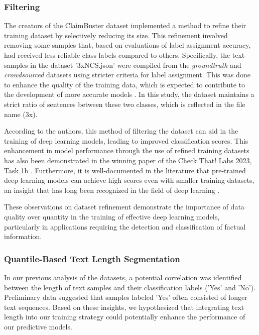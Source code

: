 \subsubsection{Filtering}

The creators of the ClaimBuster dataset implemented a method to refine their training dataset by selectively reducing its size. This refinement involved removing some samples that, based on evaluations of label assignment accuracy, had received less reliable class labels compared to others. Specifically, the text samples in the dataset '3xNCS.json' were compiled from the \textit{groundtruth} and \textit{crowdsourced} datasets using stricter criteria for label assignment. This was done to enhance the quality of the training data, which is expected to contribute to the development of more accurate models \cite{meng2020gradientbased}. In this study, the dataset maintains a strict ratio of sentences between these two classes, which is reflected in the file name (3x).

According to the authors, this method of filtering the dataset can aid in the training of deep learning models, leading to improved classification scores. This enhancement in model performance through the use of refined training datasets has also been demonstrated in the winning paper of the Check That! Labs 2023, Task 1b \cite{ct_23_040_filtering}. Furthermore, it is well-documented in the literature that pre-trained deep learning models can achieve high scores even with smaller training datasets, an insight that has long been recognized in the field of deep learning \cite{kaplan2020scaling}.

These observations on dataset refinement demonstrate the importance of data quality over quantity in the training of effective deep learning models, particularly in applications requiring the detection and classification of factual information.

\subsubsection{Quantile-Based Text Length Segmentation}
In our previous analysis of the datasets, a potential correlation was identified between the length of text samples and their classification labels ('Yes' and 'No'). Preliminary data suggested that samples labeled 'Yes' often consisted of longer text sequences. Based on these insights, we hypothesized that integrating text length into our training strategy could potentially enhance the performance of our predictive models.


